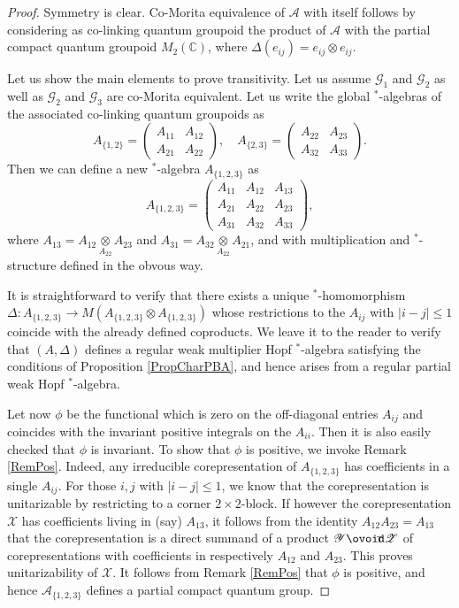 \documentclass[11pt]{article}
\newcommand{\Circt}{{\mathop{\ooalign{$\ovoid$\cr\hidewidth\raise-.05ex\hbox{$\scriptstyle\mathsf T\mkern3.5mu$}\cr}}}} %
\newcommand{\C}{\mathbb{C}}
\theoremstyle{definition}
\numberwithin{equation}{section}
\begin{document}
\begin{proof} Symmetry is clear. Co-Morita equivalence of $\mathscr{A}$ with itself follows by considering as co-linking quantum groupoid the product of $\mathscr{A}$ with the partial compact quantum groupoid $M_2(\C)$, where $\Delta(e_{ij}) = e_{ij}\otimes e_{ij}$. 

Let us show the main elements to prove transitivity. Let us assume $\mathscr{G}_1$ and $\mathscr{G}_2$ as well as $\mathscr{G}_2$ and $\mathscr{G}_3$ are co-Morita equivalent. Let us write the global $^*$-algebras of the associated co-linking quantum groupoids as \[A_{\{1,2\}} = \begin{pmatrix} A_{11} & A_{12} \\ A_{21} & A_{22} \end{pmatrix}, \quad A_{\{2,3\}} = \begin{pmatrix} A_{22} & A_{23} \\ A_{32} & A_{33}\end{pmatrix}.\] Then we can define a new $^*$-algebra $A_{\{1,2,3\}}$ as \[ A_{\{1,2,3\}} = \begin{pmatrix} A_{11} & A_{12} &   A_{13} \\ A_{21} & A_{22} & A_{23} \\ A_{31} & A_{32} & A_{33} \end{pmatrix},\] where $A_{13} = A_{12}\underset{A_{22}}{\otimes } A_{23}$ and $A_{31} = A_{32}\underset{A_{22}}{\otimes} A_{21}$, and with multiplication and $^*$-structure defined in the obvous way. 

It is straightforward to verify that there exists a unique $^*$-homomorphism $\Delta: A_{\{1,2,3\}} \rightarrow M(A_{\{1,2,3\}}\otimes A_{\{1,2,3\}})$ whose restrictions to the $A_{ij}$ with $|i-j|\leq 1$ coincide with the already defined coproducts. We leave it to the reader to verify that $(A,\Delta)$ defines a regular weak multiplier Hopf $^*$-algebra satisfying the conditions of Proposition \ref{PropCharPBA}, and hence arises from a regular partial weak Hopf $^*$-algebra. 

Let now $\phi$ be the functional which is zero on the off-diagonal entries $A_{ij}$ and coincides with the invariant positive integrals on the $A_{ii}$. Then it is also easily checked that $\phi$ is invariant. To show that $\phi$ is positive, we invoke Remark \ref{RemPos}. Indeed, any irreducible corepresentation of $A_{\{1,2,3\}}$ has coefficients in a single $A_{ij}$. For those $i,j$ with $|i-j|\leq 1$, we know that the corepresentation is unitarizable by restricting to a corner $2\times 2$-block. If however the corepresentation $\mathscr{X}$ has coefficients living in (say) $A_{13}$, it follows from the identity $A_{12}A_{23}=A_{13}$ that the corepresentation is a direct summand of a product $\mathscr{Y}\Circt \mathscr{Z}$ of corepresentations with coefficients in respectively $A_{12}$ and $A_{23}$. This proves unitarizability of $\mathscr{X}$. It follows from Remark \ref{RemPos} that $\phi$ is positive, and hence $\mathscr{A}_{\{1,2,3\}}$ defines a partial compact quantum group.  


\end{proof}
\end{document}
